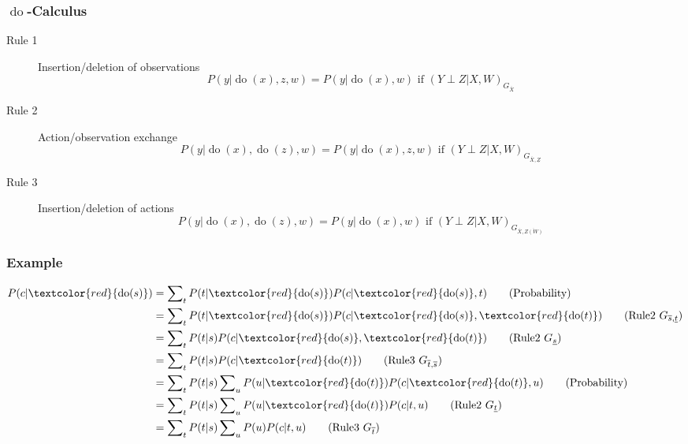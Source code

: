 \documentclass[UTF8,11pt,colorlinks,compress,openany]{beamer}%
\begin{document}
\begin{frame}\frametitle{$\operatorname{do}$-Calculus}
\begin{description}
	\item[Rule 1] Insertion/deletion of observations
	\[P(y|\operatorname{do}(x),z,w)=P(y|\operatorname{do}(x),w)\mbox{ if } (Y\perp Z | X,W)_{G_{\overline{X}}}\]
	\item[Rule 2] Action/observation exchange
	\[P(y|\operatorname{do}(x),\operatorname{do}(z),w)=P(y|\operatorname{do}(x),z,w)\mbox{ if } (Y\perp Z | X,W)_{G_{\overline{X},\underline{Z}}}\]
	\item[Rule 3] Insertion/deletion of actions
	\[P(y|\operatorname{do}(x),\operatorname{do}(z),w)=P(y|\operatorname{do}(x),w)\mbox{ if } (Y\perp Z | X,W)_{G_{\overline{X},\overline{Z(W)}}}\]
\end{description}
\end{frame}

\begin{frame}\frametitle{Example}
\begin{center}
\end{center}
\begin{align*}
P(c|\textcolor{red}{\operatorname{do}(s)})&=\sum\nolimits_t P(t|\textcolor{red}{\operatorname{do}(s)})P(c|\textcolor{red}{\operatorname{do}(s)},t) \tag{Probability}\\
&=\sum\nolimits_t P(t|\textcolor{red}{\operatorname{do}(s)})P(c|\textcolor{red}{\operatorname{do}(s)},\textcolor{red}{\operatorname{do}(t)}) \tag{Rule2 $G_{\overline{s},\underline{t}}$}\\
&=\sum\nolimits_t P(t|s)P(c|\textcolor{red}{\operatorname{do}(s)},\textcolor{red}{\operatorname{do}(t)}) \tag{Rule2 $G_{\underline{s}}$}\\
&=\sum\nolimits_t P(t|s)P(c|\textcolor{red}{\operatorname{do}(t)}) \tag{Rule3 $G_{\overline{t},\overline{s}}$}\\
&=\sum\nolimits_t P(t|s)\sum\nolimits_u P(u|\textcolor{red}{\operatorname{do}(t)})P(c|\textcolor{red}{\operatorname{do}(t)},u) \tag{Probability}\\
&=\sum\nolimits_t P(t|s)\sum\nolimits_u P(u|\textcolor{red}{\operatorname{do}(t)})P(c|t,u) \tag{Rule2 $G_{\underline{t}}$}\\
&=\sum\nolimits_t P(t|s)\sum\nolimits_u P(u)P(c|t,u) \tag{Rule3 $G_{\overline{t}}$}
\end{align*}
\end{frame}
\end{document}
